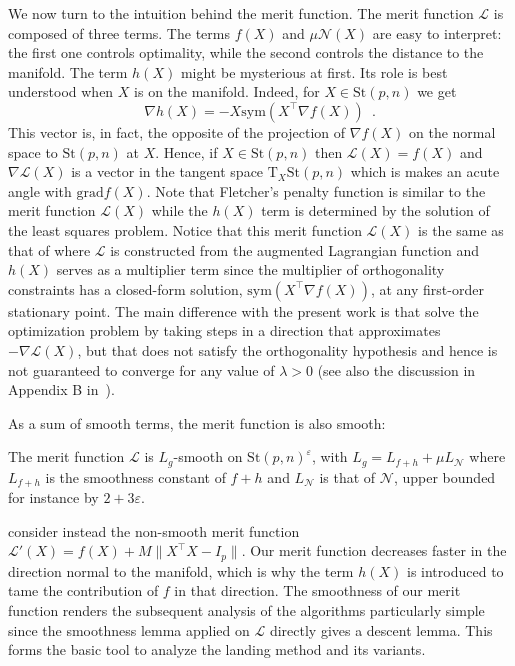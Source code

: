 \documentclass[twoside,11pt]{article}
\newcommand{\grad}{{\mathrm{grad}}}
\newcommand{\stiefel}{{\mathrm{St}(p, n)}}
\newcommand{\tangent}{{\mathrm{T}_X\stiefel}}
\begin{document}
%
%
%
%
%
%
%
%
%
We now turn to the intuition behind the merit function.
The merit function $\mathcal{L}$ is composed of three terms. The terms
$f(X)$ and $\mu\mathcal{N}(X)$ are easy to interpret: the first one controls optimality, while the second controls
the distance to the manifold. The term $h(X)$ might be mysterious at first. Its role is best understood when $X$ is on the manifold. Indeed, for $X\in\stiefel$ we get
$$
\nabla h(X) = -X\mathrm{sym}(X^\top \nabla f(X))\enspace.
$$
This vector is, in fact, the opposite of the
projection of $\nabla f(X)$ on the normal space to $\stiefel$ at $X$.
Hence, if $X\in \stiefel$ then $\mathcal{L}(X) = f(X)$ 
%
and $\nabla \mathcal{L}(X)$ is a vector in the tangent space $\tangent$ which is makes an acute angle with $\grad f(X)$. Note that Fletcher’s penalty function \citep{fletcher1970class} is similar to the merit function $\mathcal{L}(X)$ while the $h(X)$ term is determined by the solution of the least squares problem. Notice that this merit function $\mathcal{L}(X)$ is the same as that of \citet{gao2019parallelizable} where $\mathcal{L}$ is constructed from the augmented Lagrangian function and $h(X)$ serves as a multiplier term since the multiplier of orthogonality constraints has a closed-form solution, $\mathrm{sym}(X^\top \nabla f(X))$, at any first-order stationary point. The main difference with the present work is that  \citet{gao2019parallelizable} solve the optimization problem by taking steps in a direction that approximates $-\nabla \mathcal{L}(X)$, but that does not satisfy
the orthogonality hypothesis and hence is not guaranteed to converge for any value of $\lambda>0$ (see also the discussion in Appendix B in~\citep{ablin2022fast}).

%
%
As a sum of smooth terms, the merit function is also smooth:
\begin{proposition}
\label{prop:smoothness_merit}
The merit function $\mathcal{L}$ is $L_g$-smooth on $\stiefel^\varepsilon$, with $L_g = L_{f+h} + \mu L_{\mathcal{N}}$ where $L_{f+h}$ is the smoothness constant of $f + h$ and $L_{\mathcal{N}}$ is that of $\mathcal{N}$, upper bounded for instance by $2 + 3\varepsilon$.
\end{proposition}
%
%
%
%
%
%
%
%
%
%
%
%
%
%

\citet{schechtman2023orthogonal} consider instead the non-smooth merit function $\mathcal{L}'(X) = f(X) + M\|X^{\top}X-I_p\|$. Our merit function decreases faster in the direction normal to the manifold, which is why the term $h(X)$ is introduced to tame the contribution of $f$ in that direction. The smoothness of our merit function renders the subsequent analysis of the algorithms particularly simple since the smoothness lemma applied on $\mathcal{L}$ directly gives a descent lemma. This forms the basic tool to analyze the landing method and its variants.
\end{document}
